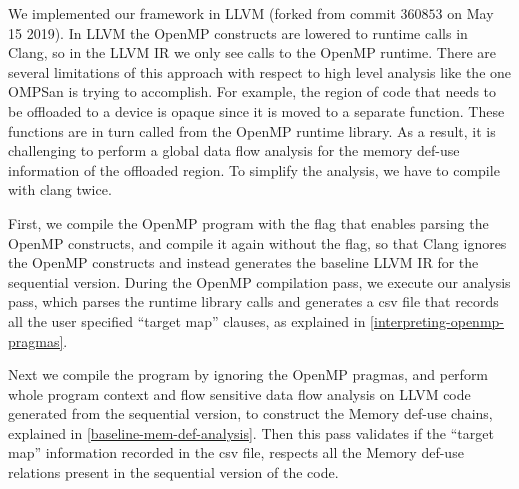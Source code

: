 We implemented our framework in LLVM (forked from commit $360853$ on May 15 2019).
In LLVM the OpenMP constructs are lowered to runtime calls in Clang, so 
in the LLVM IR we only see calls to the OpenMP runtime. 
There are several limitations of this approach with respect 
to high level analysis like the one OMPSan is trying to accomplish.
For example, the region of code that needs to be offloaded to a device 
is opaque since it is moved to a separate function. 
These functions are in turn called from the OpenMP runtime library. 
As a result, it is challenging to perform a global data flow analysis 
for the memory def-use information of the offloaded region. 
To simplify the analysis, we have to compile with clang twice. 

First, we compile the OpenMP program with the flag that enables
parsing the OpenMP constructs, and compile it again without the flag, 
so that Clang ignores the OpenMP constructs and instead generates the 
baseline LLVM IR for the sequential version. 
During the OpenMP compilation pass, we execute 
our analysis pass, which parses the runtime library calls 
and generates a csv file that records all the user specified 
``target map'' clauses, as explained in \autoref{interpreting-openmp-pragmas}.

Next we compile the program by ignoring the OpenMP pragmas, 
and perform  whole program context and flow sensitive data flow analysis
on LLVM code generated from the sequential version, to construct
the Memory def-use chains, explained in 
\autoref{baseline-mem-def-analysis}.
Then this pass validates if the ``target map''
information recorded in the csv file, respects all the Memory 
def-use relations present in the sequential version of the code.

